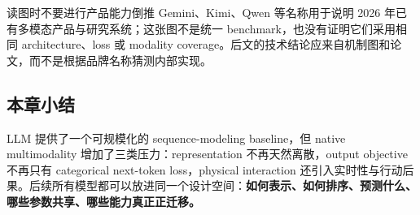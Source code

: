 
\begin{warningbox}{读图时不要进行产品能力倒推}
Gemini、Kimi、Qwen 等名称用于说明 2026 年已有多模态产品与研究系统；这张图不是统一 benchmark，也没有证明它们采用相同 architecture、loss 或 modality coverage。后文的技术结论应来自机制图和论文，而不是根据品牌名称猜测内部实现。
\end{warningbox}

\subsection{本章小结}

LLM 提供了一个可规模化的 sequence-modeling baseline，但 native multimodality 增加了三类压力：representation 不再天然离散，output objective 不再只有 categorical next-token loss，physical interaction 还引入实时性与行动后果。后续所有模型都可以放进同一个设计空间：\textbf{如何表示、如何排序、预测什么、哪些参数共享、哪些能力真正正迁移。}

